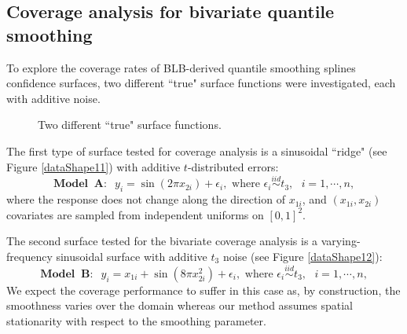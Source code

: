 \documentclass{statsoc}
\begin{document}
\subsection{Coverage analysis for bivariate quantile smoothing}
To explore the coverage rates of BLB-derived quantile smoothing splines confidence surfaces, two different ``true" surface functions were investigated, each with additive noise. 
\begin{figure}[H]
\centering   
  \caption{Two different ``true" surface functions.}
\label{fig:dataShape2}
\end{figure}

The first type of surface tested for coverage analysis is a sinusoidal ``ridge" (see Figure \ref{dataShape11}) with additive $t$-distributed errors:
\begin{equation}
    \label{two1}
    \mathbf{Model\;\;A:\;\;}y_i=\sin(2\pi x_{2i})+\epsilon_i, \text{ where } \epsilon_i\stackrel{iid}{\sim} t_3,\text{ } i=1,\cdots,n,
\end{equation}
where the response does not change along the direction of $x_{1i}$, and $(x_{1i},x_{2i})$ covariates are sampled from independent uniforms on $[0,1]^2$.

The second surface tested for the bivariate coverage analysis is a varying-frequency sinusoidal surface with additive $t_3$ noise (see Figure \ref{dataShape12}):
\begin{equation}
    \label{two2}
    \mathbf{Model\;\;B:\;\;}y_i=x_{1i}+\sin(8\pi x_{2i}^2)+\epsilon_i, \text{ where } \epsilon_i\stackrel{iid}{\sim} t_3,\text{ } i=1,\cdots,n,
\end{equation}
We expect the coverage performance to suffer in this case as, by construction, the smoothness varies over the domain whereas our method assumes spatial stationarity with respect to the smoothing parameter.
\end{document}
